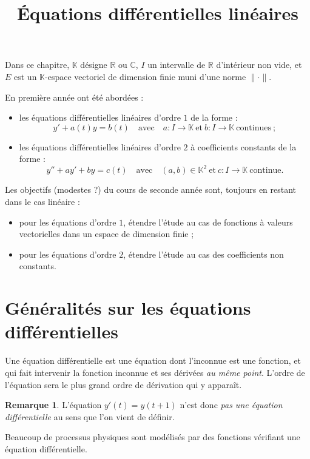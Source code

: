 \documentclass[french]{article}
\title{Équations différentielles linéaires}
\date{}
\newcommand{\R}{\mathbb{R}}
\newcommand{\C}{\mathbb{C}}
\newcommand{\K}{\mathbb{K}}
\theoremstyle{plain}
\theoremstyle{definition}
\newtheorem*{rmq}{Remarque}
\theoremstyle{remark}
\begin{document}
\tableofcontents

\newpage
\maketitle

Dans ce chapitre, $\K$ désigne $\R$ ou $\C$, $I$ un intervalle de $\R$ d'intérieur non vide, et $E$ est un $\K$-espace vectoriel de dimension finie muni d'une norme $\lVert\cdot\rVert$.

En première année ont été abordées :
\begin{itemize}
	\item les équations différentielles linéaires d'ordre $1$ de la forme :
	$$y'+a(t)y=b(t)\quad\text{avec}\quad a:I\to\K\ \text{et}\ b:I\to\K\ \text{continues}\ ;$$
	\item les équations différentielles linéaires d'ordre $2$ à coefficients constants de la forme :
	$$y''+ay'+by=c(t)\quad\text{avec}\quad (a,b)\in\K^2\ \text{et}\ c:I\to\K\ \text{continue}.$$
\end{itemize}

Les objectifs (modestes ?) du cours de seconde année sont, toujours en restant dans le cas linéaire :
\begin{itemize}
	\item pour les équations d'ordre $1$, étendre l'étude au cas de fonctions à valeurs vectorielles dans un espace de dimension finie ;
	\item pour les équations d'ordre $2$, étendre l'étude au cas des coefficients non constants.
\end{itemize}

\section{Généralités sur les équations différentielles}

Une équation différentielle est une équation dont l'inconnue est une fonction, et qui fait intervenir la fonction inconnue et ses dérivées \textit{au même point}. L'ordre de l'équation sera le plus grand ordre de dérivation qui y apparaît.

\begin{rmq}
	L'équation $y'(t)=y(t+1)$ n'est donc \textit{pas une équation différentielle} au sens que l'on vient de définir.
\end{rmq}

Beaucoup de processus physiques sont modélisés par des fonctions vérifiant une équation différentielle.
\end{document}
